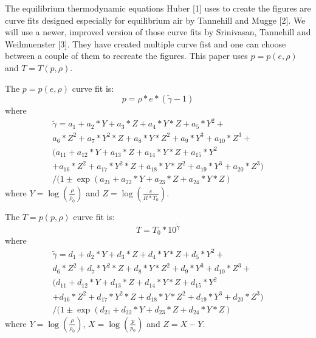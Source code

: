\documentclass[9pt]{article}
\begin{document}
The equilibrium thermodynamic equations Huber [1] uses to create the figures are curve fits designed especially for equilibrium air by Tannehill and Mugge [2]. We will use a newer, improved version of those curve fits by Srinivasan, Tannehill and Weilmuenster [3]. They have created multiple curve fist and one can choose between a couple of them to recreate the figures. This paper uses $p=p(e,\rho)$ and $T=T(p,\rho)$.

\noindent The $p=p(e,\rho)$ curve fit is:
\begin{equation}
\label{p_correlation}
p=\rho*e*(\tilde{\gamma}-1) 
\end{equation}
where
\[
\begin{split}
\tilde{\gamma} =a_{1}+a_{2}*Y+a_{3}*Z+a_{4}*Y*Z+a_{5}*Y^{2}+\\
a_{6}*Z^{2}+a_{7}*Y^{2}*Z+a_{8}*Y*Z^{2}+a_{9}*Y^{3}+a_{10}*Z^{3}+\\
(a_{11}+a_{12}*Y+a_{13}*Z+a_{14}*Y*Z+a_{15}*Y^{2}\\
+a_{16}*Z^{2}+a_{17}*Y^{2}*Z+a_{18}*Y*Z^{2}+a_{19}*Y^{3}+a_{20}*Z^{3})\\
/(1\pm\exp(a_{21}+a_{22}*Y+a_{23}*Z+a_{24}*Y*Z)
\end{split}
\]
where $Y=\log(\frac{\rho}{\rho_{0}})$ and $Z=\log(\frac{e}{R*T_{0}})$.

\noindent The $T=p(p,\rho)$ curve fit is:
\begin{equation}
\label{T_correlation}
T=T_{0}*10^{\tilde{\gamma}}
\end{equation}
where
\[
\begin{split}
 \tilde{\gamma} =d_{1}+d_{2}*Y+d_{3}*Z+d_{4}*Y*Z+d_{5}*Y^{2}+\\
d_{6}*Z^{2}+d_{7}*Y^{2}*Z+d_{8}*Y*Z^{2}+d_{9}*Y^{3}+d_{10}*Z^{3}+\\
(d_{11}+d_{12}*Y+d_{13}*Z+d_{14}*Y*Z+d_{15}*Y^{2}\\
+d_{16}*Z^{2}+d_{17}*Y^{2}*Z+d_{18}*Y*Z^{2}+d_{19}*Y^{3}+d_{20}*Z^{3})\\
/(1\pm\exp(d_{21}+d_{22}*Y+d_{23}*Z+d_{24}*Y*Z)
\end{split}
\]
where $Y=\log(\frac{\rho}{\rho_{0}})$, $X=\log(\frac{p}{p_{0}})$ and $Z=X-Y$.
\end{document}
